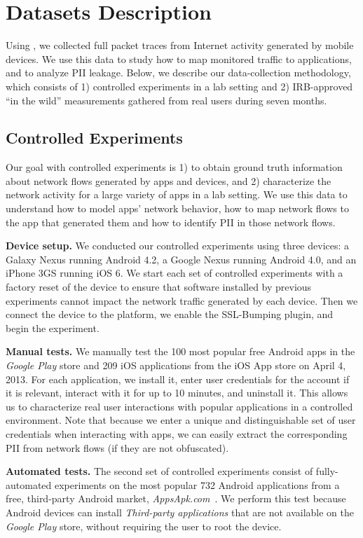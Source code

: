 \section{Datasets Description}
\label{sec:dataset}
Using \platname, we collected full packet traces from Internet activity generated by
mobile devices. We use this data to study how to map monitored traffic to applications, and to
analyze PII leakage. Below, we describe our data-collection methodology, which consists of
1) controlled experiments in a lab setting and 2) IRB-approved ``in the wild'' measurements 
gathered from real users during seven months.

\subsection{Controlled Experiments}
\label{sec:dataset-contr-exper}
Our goal with controlled experiments is 1) to obtain ground truth information 
about network flows generated by apps and devices, and 2) characterize the 
network activity for a large variety of apps in a lab setting. We use 
this data to understand how to model apps' network behavior, how to map network flows 
to the app that generated them and how to identify PII in those network flows. 

\noindent\textbf{Device setup.} We conducted our controlled experiments using three devices: a Galaxy
Nexus running Android 4.2, a Google Nexus running Android 4.0, and
an iPhone 3GS running iOS 6. We start each set of controlled experiments
 with a factory reset of the device to ensure that software installed by previous 
 experiments cannot impact the network traffic generated by each device. 
 Then we connect the device to the
\platname{} platform, we enable the SSL-Bumping plugin, and begin
the experiment. 

\noindent\textbf{Manual tests.} We manually test the
100 most popular free Android apps in the \emph{Google Play} store and 209
iOS applications from the iOS App store on April 4, 2013. For each
application, we install it, enter user credentials for the account if
it is relevant, interact with it for up to 10 minutes, and uninstall
it. This allows us to characterize real user interactions with popular applications 
in a controlled environment. Note that 
because we enter a unique and distinguishable set of user credentials when 
interacting with apps, we can easily extract the corresponding PII from 
network flows (if they are not obfuscated).

\noindent\textbf{Automated tests.} The second set of controlled experiments consist of fully-automated
experiments on the most popular 732 Android applications from a free,
third-party Android market, \emph{AppsApk.com}~\cite{appsapk}.
We perform this test because Android devices can install
\emph{Third-party applications} that are not available on the
\emph{Google Play} store, without requiring the user to root the device. 

